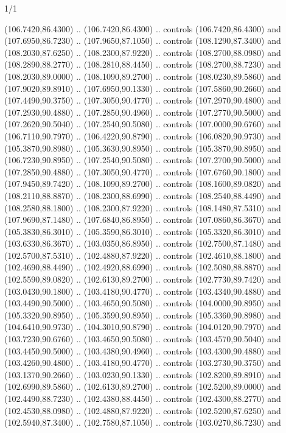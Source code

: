 \begin{flagdescription}{1/1}
\begin{scope}[xshift=0.75\flaglength]
\begin{scope}[scale=0.00209\flagwidth,yshift=134.4mm,xshift=-29.7mm]
\begin{scope}[y=0.80pt, x=0.80pt, yscale=-1, xscale=1, inner sep=0pt, outer sep=0pt,line width=0.0015\flagwidth]
  (106.7420,86.4300) .. (106.7420,86.4300) .. controls (106.7420,86.4300) and
  (107.6950,86.7230) .. (107.9650,87.1050) .. controls (108.1290,87.3400) and
  (108.2030,87.6250) .. (108.2300,87.9220) .. controls (108.2700,88.0980) and
  (108.2890,88.2770) .. (108.2810,88.4450) .. controls (108.2700,88.7230) and
  (108.2030,89.0000) .. (108.1090,89.2700) .. controls (108.0230,89.5860) and
  (107.9020,89.8910) .. (107.6950,90.1330) .. controls (107.5860,90.2660) and
  (107.4490,90.3750) .. (107.3050,90.4770) .. controls (107.2970,90.4800) and
  (107.2930,90.4880) .. (107.2850,90.4960) .. controls (107.2770,90.5000) and
  (107.2620,90.5040) .. (107.2540,90.5080) .. controls (107.0000,90.6760) and
  (106.7110,90.7970) .. (106.4220,90.8790) .. controls (106.0820,90.9730) and
  (105.3870,90.8980) .. (105.3630,90.8950) .. controls (105.3870,90.8950) and
  (106.7230,90.8950) .. (107.2540,90.5080) .. controls (107.2700,90.5000) and
  (107.2850,90.4880) .. (107.3050,90.4770) .. controls (107.6760,90.1800) and
  (107.9450,89.7420) .. (108.1090,89.2700) .. controls (108.1600,89.0820) and
  (108.2110,88.8870) .. (108.2300,88.6990) .. controls (108.2540,88.4490) and
  (108.2580,88.1800) .. (108.2300,87.9220) .. controls (108.1480,87.5310) and
  (107.9690,87.1480) .. (107.6840,86.8950) .. controls (107.0860,86.3670) and
  (105.3830,86.3010) .. (105.3590,86.3010) .. controls (105.3320,86.3010) and
  (103.6330,86.3670) .. (103.0350,86.8950) .. controls (102.7500,87.1480) and
  (102.5700,87.5310) .. (102.4880,87.9220) .. controls (102.4610,88.1800) and
  (102.4690,88.4490) .. (102.4920,88.6990) .. controls (102.5080,88.8870) and
  (102.5590,89.0820) .. (102.6130,89.2700) .. controls (102.7730,89.7420) and
  (103.0430,90.1800) .. (103.4180,90.4770) .. controls (103.4340,90.4880) and
  (103.4490,90.5000) .. (103.4650,90.5080) .. controls (104.0000,90.8950) and
  (105.3320,90.8950) .. (105.3590,90.8950) .. controls (105.3360,90.8980) and
  (104.6410,90.9730) .. (104.3010,90.8790) .. controls (104.0120,90.7970) and
  (103.7230,90.6760) .. (103.4650,90.5080) .. controls (103.4570,90.5040) and
  (103.4450,90.5000) .. (103.4380,90.4960) .. controls (103.4300,90.4880) and
  (103.4260,90.4800) .. (103.4180,90.4770) .. controls (103.2730,90.3750) and
  (103.1370,90.2660) .. (103.0230,90.1330) .. controls (102.8200,89.8910) and
  (102.6990,89.5860) .. (102.6130,89.2700) .. controls (102.5200,89.0000) and
  (102.4490,88.7230) .. (102.4380,88.4450) .. controls (102.4300,88.2770) and
  (102.4530,88.0980) .. (102.4880,87.9220) .. controls (102.5200,87.6250) and
  (102.5940,87.3400) .. (102.7580,87.1050) .. controls (103.0270,86.7230) and

\end{scope}
\end{scope}
\end{scope}
\end{flagdescription}
